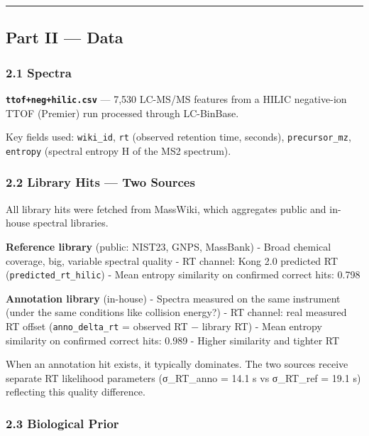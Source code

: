 \begin{center}\rule{0.5\linewidth}{0.5pt}\end{center}

\subsection{Part II --- Data}\label{part-ii-data}

\subsubsection{2.1 Spectra}\label{spectra}

\textbf{\texttt{ttof+neg+hilic.csv}} --- 7,530 LC-MS/MS features from a
HILIC negative-ion TTOF (Premier) run processed through LC-BinBase.

Key fields used: \texttt{wiki\_id}, \texttt{rt} (observed retention
time, seconds), \texttt{precursor\_mz}, \texttt{entropy} (spectral
entropy H of the MS2 spectrum).

\subsubsection{2.2 Library Hits --- Two
Sources}\label{library-hits-two-sources}

All library hits were fetched from MassWiki, which aggregates public and
in-house spectral libraries.

\textbf{Reference library} (public: NIST23, GNPS, MassBank) - Broad
chemical coverage, big, variable spectral quality - RT channel: Kong 2.0
predicted RT (\texttt{predicted\_rt\_hilic}) - Mean entropy similarity
on confirmed correct hits: 0.798

\textbf{Annotation library} (in-house) - Spectra measured on the same
instrument (under the same conditions like collision energy?) - RT
channel: real measured RT offset (\texttt{anno\_delta\_rt} = observed RT
− library RT) - Mean entropy similarity on confirmed correct hits: 0.989
- Higher similarity and tighter RT

When an annotation hit exists, it typically dominates. The two sources
receive separate RT likelihood parameters (σ\_RT\_anno = 14.1 s vs
σ\_RT\_ref = 19.1 s) reflecting this quality difference.

\subsubsection{2.3 Biological Prior}\label{biological-prior}

